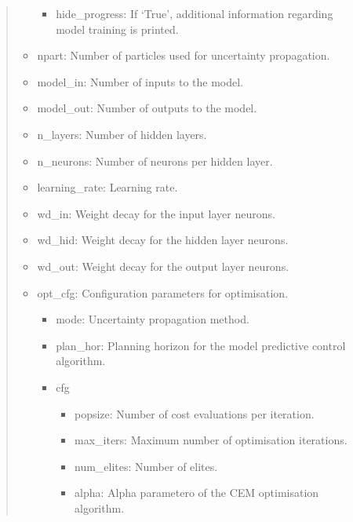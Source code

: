 \documentclass[letterpaper,10pt,english,openany,oneside]{sphinxmanual}
\begin{document}
\begin{itemize}
\begin{quote}
\begin{itemize}
\begin{itemize}
\item {} 
hide\_progress: If ‘True’, additional information regarding model training is printed.

\end{itemize}

\item {} 
npart: Number of particles used for uncertainty propagation.

\item {} 
model\_in: Number of inputs to the model.

\item {} 
model\_out: Number of outputs to the model.

\item {} 
n\_layers: Number of hidden layers.

\item {} 
n\_neurons: Number of neurons per hidden layer.

\item {} 
learning\_rate: Learning rate.

\item {} 
wd\_in: Weight decay for the input layer neurons.

\item {} 
wd\_hid: Weight decay for the hidden layer neurons.

\item {} 
wd\_out: Weight decay for the output layer neurons.

\end{itemize}
\begin{itemize}
\item {} 
opt\_cfg: Configuration parameters for optimisation.
\begin{itemize}
\item {} 
mode: Uncertainty propagation method.

\item {} 
plan\_hor: Planning horizon for the model predictive control algorithm.

\item {} 
cfg
\begin{itemize}
\item {} 
popsize: Number of cost evaluations per iteration.

\item {} 
max\_iters: Maximum number of optimisation iterations.

\item {} 
num\_elites: Number of elites.

\item {} 
alpha: Alpha parametero of the CEM optimisation algorithm.


\end{itemize}
\end{itemize}
\end{itemize}
\end{quote}
\end{itemize}
\end{document}

